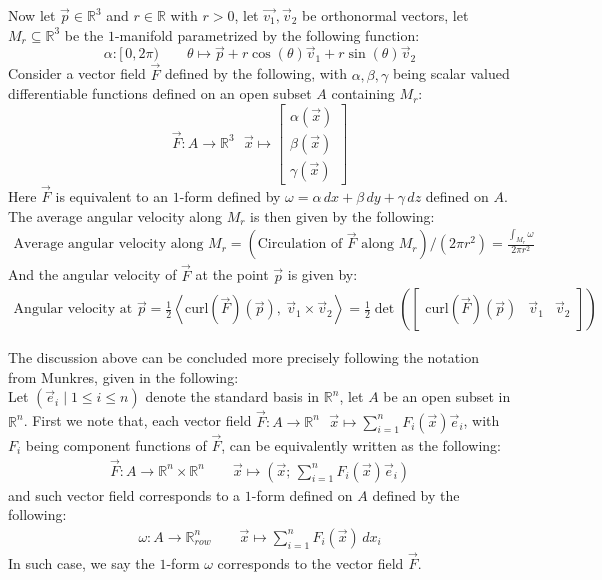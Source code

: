 \documentclass[15pt]{book}
\theoremstyle{break}
\theoremstyle{break}
\newcommand{\R}{\mathbb{R}}
\newcommand{\bmat}[1]{\begin{bmatrix} #1 \end{bmatrix}}
\begin{document}
Now let $\vec{p} \in \R^3$ and $r \in \R$ with $r>0$, let $\vec{v_1},\vec{v}_2$ be orthonormal vectors, let $M_r \subseteq \R^3$ be the $1$-manifold parametrized by the following function:
$$\alpha:[\,0, 2\pi)\qquad \theta \mapsto \vec{p} + r\cos(\theta) \vec{v}_1 + r\sin(\theta) \vec{v}_2$$ 
Consider a vector field $\vec{F}$ defined by the following, with $\alpha,\beta, \gamma$ being scalar valued differentiable functions defined on an open subset $A$ containing $M_r$:
$$\vec{F}:A \to \R^3 \ \ \ \vec{x}\mapsto \bmat{\alpha(\vec{x})\\ \beta(\vec{x}) \\ \gamma(\vec{x})}$$
Here $\vec{F}$ is equivalent to an $1$-form defined by $\omega = \alpha\, dx + \beta\, dy + \gamma \, dz$ defined on $A$. \\
The average angular velocity along $M_r$ is then given by the following:
\begin{align*}
\text{Average angular velocity along }M_r = \left(\text{Circulation of }\vec{F}\text{ along }M_r\right)/(2\pi r^2) = \frac{\int_{M_r} \omega}{2\pi r^2} 
\end{align*}
And the angular velocity of $\vec{F}$ at the point $\vec{p}$ is given by:
\begin{align*}
\text{Angular velocity at }\vec{p} =  \frac{1}{2}\left< \text{curl}(\vec{F})(\vec{p}), \ \vec{v}_1\times \vec{v}_2 \right> = \frac{1}{2}\det\left( \bmat{ \text{curl}(\vec{F})(\vec{p})& \vec{v}_1&  \vec{v}_2 }\right)
\end{align*}

The discussion above can be concluded more precisely following the notation from Munkres, given in the following:\\

Let $(\vec{e}_i\mid 1\leq i\leq n)$ denote the standard basis in $\R^n$, let $A$ be an open subset in $\R^n$. First we note that, each vector field $\vec{F}:A \to \R^n \ \ \ \vec{x}\mapsto \sum_{i=1}^n F_i (\vec{x}) \vec{e}_i$, with $F_i$ being component functions of $\vec{F}$, can be equivalently written as the following:
\begin{align*}
\vec{F}:A \to \R^n \times \R^n \qquad\vec{x}\mapsto \left(\vec{x};\, \sum_{i=1}^n F_i (\vec{x}) \vec{e}_i\right)
\end{align*}
and such vector field corresponds to a $1$-form defined on $A$ defined by the following:
\begin{align*}
\omega :A \to \R^n_{row}\qquad \vec{x}\mapsto \sum_{i=1}^n F_i(\vec{x}) \, dx_i
\end{align*}
In such case, we say the $1$-form $\omega$ corresponds to the vector field $\vec{F}$. 
\end{document}
